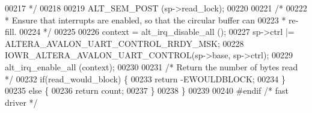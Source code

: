 \begin{DoxyCode}
00217 \textcolor{comment}{   */}
00218 
00219   ALT_SEM_POST (sp->read\_lock);
00220 
00221   \textcolor{comment}{/*}
00222 \textcolor{comment}{   * Ensure that interrupts are enabled, so that the circular buffer can}
00223 \textcolor{comment}{   * re-fill.}
00224 \textcolor{comment}{   */}
00225 
00226   context = alt_irq_disable_all ();
00227   sp->ctrl |= ALTERA_AVALON_UART_CONTROL_RRDY_MSK;
00228   IOWR_ALTERA_AVALON_UART_CONTROL(sp->base, sp->ctrl);
00229   alt_irq_enable_all (context);
00230 
00231   \textcolor{comment}{/* Return the number of bytes read */}
00232   \textcolor{keywordflow}{if}(read\_would\_block) \{
00233     \textcolor{keywordflow}{return} -EWOULDBLOCK;
00234   \}
00235   \textcolor{keywordflow}{else} \{
00236     \textcolor{keywordflow}{return} count;
00237   \}
00238 \}
00239 
00240 \textcolor{preprocessor}{#endif }\textcolor{comment}{/* fast driver */}\textcolor{preprocessor}{}
\end{DoxyCode}
